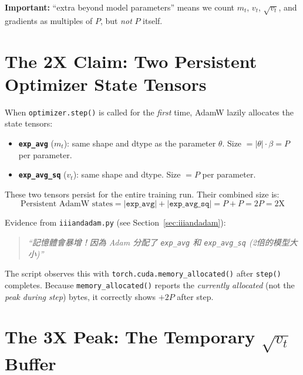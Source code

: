 \documentclass[11pt,a4paper]{article}
\begin{document}
\noindent\textbf{Important:} ``extra beyond model parameters'' means we
count $m_t$, $v_t$, $\sqrt{v_t}$, and gradients as multiples of $P$, but
\emph{not} $P$ itself.

\section{The 2X Claim: Two Persistent Optimizer State Tensors}
\label{sec:2x}

When \texttt{optimizer.step()} is called for the \emph{first} time, AdamW
lazily allocates the state tensors:

\begin{itemize}
  \item \textbf{\texttt{exp\_avg}} ($m_t$): same shape and dtype as the
    parameter $\theta$. Size $= |\theta|\cdot\beta = P$ per parameter.
  \item \textbf{\texttt{exp\_avg\_sq}} ($v_t$): same shape and dtype.
    Size $= P$ per parameter.
\end{itemize}

These two tensors persist for the entire training run.  Their combined size
is:
\begin{equation}
  \text{Persistent AdamW states} = |\mathtt{exp\_avg}| + |\mathtt{exp\_avg\_sq}|
  = P + P = 2P = 2\mathrm{X}
  \label{eq:2x}
\end{equation}

\medskip
\noindent Evidence from \texttt{iiiandadam.py} (see Section~\ref{sec:iiiandadam}):
\begin{quote}
\textit{``記憶體會暴增！因為 Adam 分配了 \texttt{exp\_avg} 和
\texttt{exp\_avg\_sq} (2倍的模型大小)''}
\end{quote}
The script observes this with \texttt{torch.cuda.memory\_allocated()} after
\texttt{step()} completes.  Because \texttt{memory\_allocated()} reports
the \emph{currently allocated} (not the \emph{peak during step}) bytes, it
correctly shows $+2P$ after step.

\section{The 3X Peak: The Temporary \texorpdfstring{$\sqrt{v_t}$}{sqrt(v)}
         Buffer}
\label{sec:3x}
\end{document}
